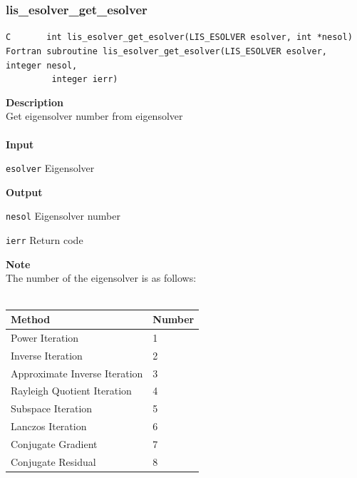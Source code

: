 \documentclass[a4paper]{article}
\newcommand{\namelistlabel}[1]{\mbox{#1}\hfill}
\newenvironment{namelist}[1]{%
 \begin{list}{}
  {\let\makelabel\namelistlabel
  \settowidth{\labelwidth}{#1}
  \setlength{\leftmargin}{1.1\labelwidth}}
}{%
\end{list}}
\begin{document}
  \subsubsection{lis\_esolver\_get\_esolver}
\begin{screen}
\verb|C       int lis_esolver_get_esolver(LIS_ESOLVER esolver, int *nesol)|\\
\verb|Fortran subroutine lis_esolver_get_esolver(LIS_ESOLVER esolver, integer nesol,|\\
\verb|         integer ierr)|
\end{screen}
{\bf Description}\\
\indent
Get eigensolver number from eigensolver
\\ \\
\noindent
{\bf Input}
\begin{namelist}{XXXXXXXXXXXXXXXXXXXX}
\item[\tt esolver] Eigensolver
\end{namelist}
{\bf Output}
\begin{namelist}{XXXXXXXXXXXXXXXXXXXX}
\item[\tt nesol] Eigensolver number
\item[\tt ierr] Return code
\end{namelist}
{\bf Note}\\
\indent
The number of the eigensolver is as follows:\\ \\
\begin{minipage}[t]{\textwidth}
\begin{center}
\begin{tabular}{l|l}\hline\hline
 Method      & Number \\ \hline

 Power Iteration                              & 1    \\ 
 Inverse Iteration                            & 2    \\
 Approximate Inverse Iteration                & 3    \\
 Rayleigh Quotient Iteration                  & 4    \\
 Subspace Iteration                           & 5    \\
 Lanczos Iteration                            & 6    \\
 Conjugate Gradient                           & 7    \\
 Conjugate Residual                           & 8    \\
\hline         
\end{tabular}
\end{center}
\end{minipage}
\end{document}
